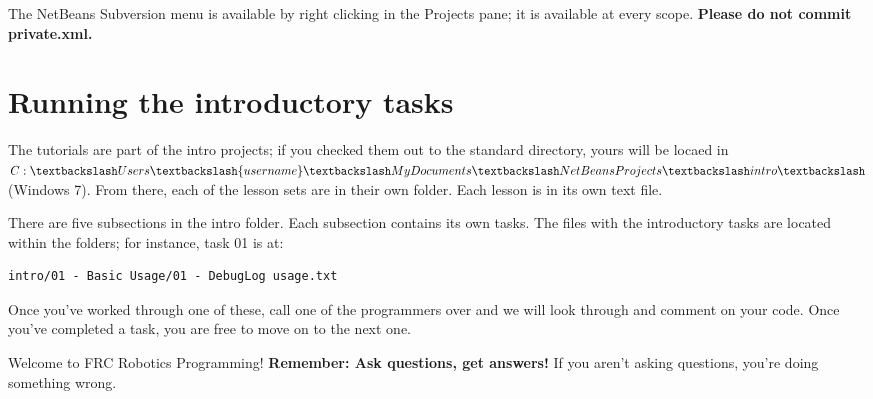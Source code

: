 \documentclass[a4paper]{article}
\begin{document}
The NetBeans Subversion menu is available by right clicking in the Projects pane; it is available at every scope. \textbf{Please do not commit private.xml.}

\section{Running the introductory tasks}

The tutorials are part of the intro projects; if you checked them out to the standard directory, yours will be locaed in $C:\textbackslash Users\textbackslash\{username\}\textbackslash My Documents\textbackslash NetBeansProjects\textbackslash intro\textbackslash$ (Windows 7). From there, each of the lesson sets are in their own folder. Each lesson is in its own text file.

There are five subsections in the intro folder. Each subsection contains its own tasks. The files with the introductory tasks are located within the folders; for instance, task 01 is at:\begin{verbatim}intro/01 - Basic Usage/01 - DebugLog usage.txt\end{verbatim}

Once you've worked through one of these, call one of the programmers over and we will look through and comment on your code. Once you've completed a task, you are free to move on to the next one. 

Welcome to FRC Robotics Programming! \textbf{Remember: Ask questions, get answers!} If you aren't asking questions, you're doing something wrong.
\end{document}
